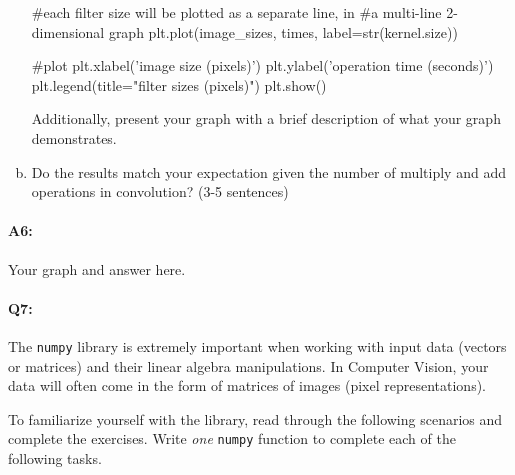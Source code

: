 \begin{enumerate}[(a)]
\begin{python}
    #each filter size will be plotted as a separate line, in
    #a multi-line 2-dimensional graph
    plt.plot(image_sizes, times, label=str(kernel.size))

#plot
plt.xlabel('image size (pixels)')
plt.ylabel('operation time (seconds)')
plt.legend(title="filter sizes (pixels)")
plt.show()

\end{python}

    Additionally, present your graph with a brief description of what your graph demonstrates.

\item
    Do the results match your expectation given the number of multiply and add operations in convolution? (3-5 sentences)
\end{enumerate}

\pagebreak
\paragraph{A6:} Your graph and answer here.





\pagebreak
\paragraph{Q7:} The \texttt{numpy} library is extremely important when working with input data (vectors or matrices) and their linear algebra manipulations. In Computer Vision, your data will often come in the form of matrices of images (pixel representations). 

 To familiarize yourself with the library, read through the following scenarios and complete the exercises. Write \emph{one} \texttt{numpy} function to complete each of the following tasks.

